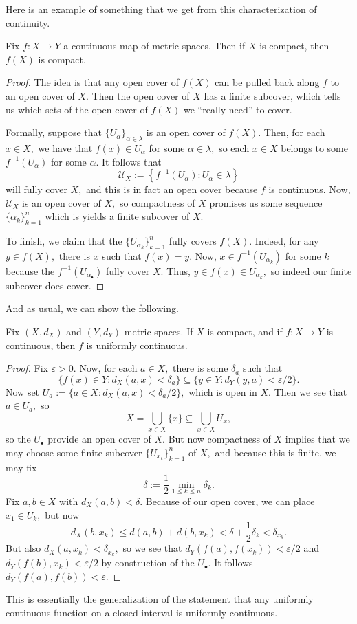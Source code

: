 \documentclass[../notes.tex]{subfiles}
\begin{document}
Here is an example of something that we get from this characterization of continuity.
\begin{proposition}
	Fix $f:X\to Y$ a continuous map of metric spaces. Then if $X$ is compact, then $f(X)$ is compact.
\end{proposition}
\begin{proof}
	The idea is that any open cover of $f(X)$ can be pulled back along $f$ to an open cover of $X.$ Then the open cover of $X$ has a finite subcover, which tells us which sets of the open cover of $f(X)$ we ``really need'' to cover.

	Formally, suppose that $\{U_\alpha\}_{\alpha\in\lambda}$ is an open cover of $f(X).$ Then, for each $x\in X,$ we have that $f(x)\in U_\alpha$ for some $\alpha\in\lambda,$ so each $x\in X$ belongs to some $f^{-1}(U_\alpha)$ for some $\alpha.$ It follows that
	\[\mathcal U_X:=\left\{f^{-1}(U_\alpha):U_\alpha\in\lambda\right\}\]
	will fully cover $X,$ and this is in fact an open cover because $f$ is continuous. Now, $\mathcal U_X$ is an open cover of $X,$ so compactness of $X$ promises us some sequence $\{\alpha_k\}_{k=1}^n$ which is yields a finite subcover of $X.$

	To finish, we claim that the $\{U_{\alpha_k}\}_{k=1}^n$ fully covers $f(X).$ Indeed, for any $y\in f(X),$ there is $x$ such that $f(x)=y.$ Now, $x\in f^{-1}(U_{\alpha_k})$ for some $k$ because the $f^{-1}(U_{\alpha_\bullet})$ fully cover $X.$ Thus, $y\in f(x)\in U_{\alpha_k},$ so indeed our finite subcover does cover.
\end{proof}
And as usual, we can show the following.
\begin{proposition}
	Fix $(X,d_X)$ and $(Y,d_Y)$ metric spaces. If $X$ is compact, and if $f:X\to Y$ is continuous, then $f$ is uniformly continuous.
\end{proposition}
\begin{proof}
	Fix $\varepsilon>0.$ Now, for each $a\in X,$ there is some $\delta_a$ such that
	\[\{f(x)\in Y:d_X(a,x)<\delta_a\}\subseteq\{y\in Y:d_Y(y,a)<\varepsilon/2\}.\]
	Now set $U_a:=\{a\in X:d_X(a,x)<\delta_a/2\},$ which is open in $X.$ Then we see that $a\in U_a,$ so
	\[X=\bigcup_{x\in X}\{x\}\subseteq\bigcup_{x\in X}U_x,\]
	so the $U_\bullet$ provide an open cover of $X.$ But now compactness of $X$ implies that we may choose some finite subcover $\{U_{x_k}\}_{k=1}^n$ of $X,$ and because this is finite, we may fix
	\[\delta:=\frac12\min_{1\le k\le n}\delta_k.\]
	Fix $a,b\in X$ with $d_X(a,b)<\delta.$ Because of our open cover, we can place $x_1\in U_k,$ but now
	\[d_X(b,x_k)\le d(a,b)+d(b,x_k)<\delta+\frac12\delta_k<\delta_{x_k}.\]
	But also $d_X(a,x_k)<\delta_{x_k},$ so we see that $d_Y(f(a),f(x_k))<\varepsilon/2$ and $d_Y(f(b),x_k)<\varepsilon/2$ by construction of the $U_\bullet.$ It follows $d_Y(f(a),f(b))<\varepsilon.$
\end{proof}
\begin{remark}
	This is essentially the generalization of the statement that any uniformly continuous function on a closed interval is uniformly continuous.
\end{remark}
\end{document}
